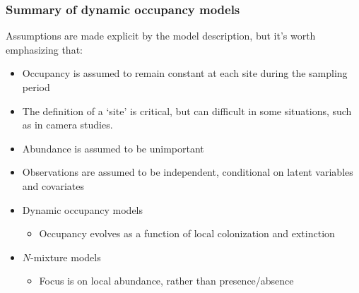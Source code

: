\documentclass[color=usenames,dvipsnames]{beamer}\usepackage[]{graphicx}\usepackage[]{color}
\begin{document}
\begin{frame}
  \frametitle{Summary of dynamic occupancy models}
  \small
  Assumptions are made explicit by the model description, but it's worth emphasizing that: 
  \begin{itemize}[<+->]
    \item<2-> Occupancy is assumed to remain constant at each site during the sampling period
    \item<3-> The definition of a `site' is critical, but can difficult in
      some situations, such as in camera studies.
    \item<4-> Abundance is assumed to be unimportant
    \item<5-> Observations are assumed to be independent, conditional
      on latent variables and covariates
  \end{itemize}
  \vfill
  \begin{itemize}
    \item<7-> Dynamic occupancy models
    \begin{itemize}
      \item Occupancy evolves as a function of local colonization
        and extinction
    \end{itemize}
    \item<8-> $N$-mixture models
    \begin{itemize}
      \item Focus is on local abundance, rather than presence/absence
    \end{itemize}
  \end{itemize}
  \vfill
\end{frame}
\end{document}
